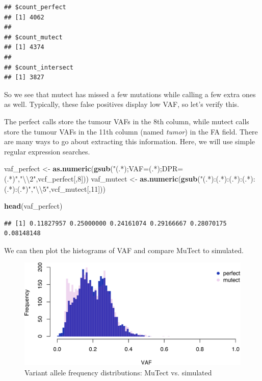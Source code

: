 \documentclass[]{article}
\newenvironment{Shaded}{\begin{snugshade}}{\end{snugshade}}
\newcommand{\CharTok}[1]{\textcolor[rgb]{0.31,0.60,0.02}{#1}}
\newcommand{\DecValTok}[1]{\textcolor[rgb]{0.00,0.00,0.81}{#1}}
\newcommand{\KeywordTok}[1]{\textcolor[rgb]{0.13,0.29,0.53}{\textbf{#1}}}
\newcommand{\NormalTok}[1]{#1}
\newcommand{\StringTok}[1]{\textcolor[rgb]{0.31,0.60,0.02}{#1}}
\begin{document}
\begin{verbatim}
## $count_perfect
## [1] 4062
## 
## $count_mutect
## [1] 4374
## 
## $count_intersect
## [1] 3827
\end{verbatim}

So we see that mutect has missed a few mutations while calling a few
extra ones as well. Typically, these false positives display low VAF, so
let's verify this.

The perfect calls store the tumour VAFs in the 8th column, while mutect
calls store the tumour VAFs in the 11th column (named \emph{tumor}) in
the FA field. There are many ways to go about extracting this
information. Here, we will use simple regular expression searches.

\begin{Shaded}
\begin{Highlighting}[]
\NormalTok{vaf_perfect <-}\StringTok{ }\KeywordTok{as.numeric}\NormalTok{(}\KeywordTok{gsub}\NormalTok{(}\StringTok{"(.*);VAF=(.*);DPR=(.*)"}\NormalTok{,}\StringTok{"}\CharTok{\textbackslash{}\textbackslash{}}\StringTok{2"}\NormalTok{,vcf_perfect[,}\DecValTok{8}\NormalTok{]))}
\NormalTok{vaf_mutect <-}\StringTok{ }\KeywordTok{as.numeric}\NormalTok{(}\KeywordTok{gsub}\NormalTok{(}\StringTok{"(.*):(.*):(.*):(.*):(.*):(.*)"}\NormalTok{,}\StringTok{"}\CharTok{\textbackslash{}\textbackslash{}}\StringTok{5"}\NormalTok{,vcf_mutect[,}\DecValTok{11}\NormalTok{]))}
\end{Highlighting}
\end{Shaded}

\begin{Shaded}
\begin{Highlighting}[]
\KeywordTok{head}\NormalTok{(vaf_perfect)}
\end{Highlighting}
\end{Shaded}

\begin{verbatim}
## [1] 0.11827957 0.25000000 0.24161074 0.29166667 0.28070175 0.08148148
\end{verbatim}

We can then plot the histograms of VAF and compare MuTect to simulated.

\begin{figure}

{\centering \includegraphics{src_guide_files/figure-latex/fig1-1} 

}

\caption{\label{fig1}Variant allele frequency distributions: MuTect vs. simulated}\label{fig:fig1}
\end{figure}
\end{document}
